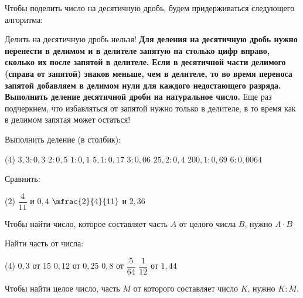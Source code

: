 %
%
%
%
\begin{class}[number=1]
	\begin{definit}
		Чтобы поделить число на десятичную дробь, будем придерживаться следующего алгоритма:
		\begin{tasks}
			\task Делить на десятичную дробь нельзя!
			\task \textbf{Для деления на десятичную дробь нужно перенести в делимом и в
			делителе запятую на столько цифр вправо, сколько их после запятой в
			делителе.}
			\task \textbf{Если в десятичной части делимого (справа от запятой) знаков меньше, чем в делителе, то во время переноса запятой добавляем в делимом нули для каждого недостающего разряда.}
			\task \textbf{Выполнить деление десятичной дроби на натуральное число.}
			\task Еще раз подчеркнем, что избавляться от запятой нужно только в
			делителе, в то время как в делимом запятая может остаться!
		\end{tasks}
	\end{definit}
	\begin{listofex}
		\item Выполнить деление (в столбик):
		\begin{tasks}(4)
			\task \( 3,3:0,3 \)
			\task \( 2:0,5 \)
			\task \( 1:0,1 \)
			\task \( 5,1:0,17 \)
			\task \( 3:0,06 \)
			\task \( 25,2:0,4 \)
			\task \( 200,1:0,69 \)
			\task \( 6:0,0064 \)
		\end{tasks}
		\item Сравнить:
		\begin{tasks}(2)
			\task \( \dfrac{4}{11} \) и \( 0,4 \)
			\task \( \mfrac{2}{4}{11} \) и \( 2,36 \)
		\end{tasks}
	\end{listofex}
	\begin{definit}
		Чтобы найти число, которое составляет часть \( A \) от целого числа \( B \), нужно \( A\cdot B \)
	\end{definit}
	\begin{listofex}[resume]
		\item Найти часть от числа:
		\begin{tasks}(4)
			\task \( 0,3 \) от \( 15 \)
			\task \( 0,12 \) от \( 0,25 \)
			\task \( 0,8 \) от \( \dfrac{5}{64} \)
			\task \( \dfrac{1}{12} \) от \( 1,44 \)
		\end{tasks}
	\end{listofex}
	\begin{definit}
	Чтобы найти целое число, часть \( M \) от которого составляет число \( K \), нужно \( K:M \).

\end{definit}
\end{class}
